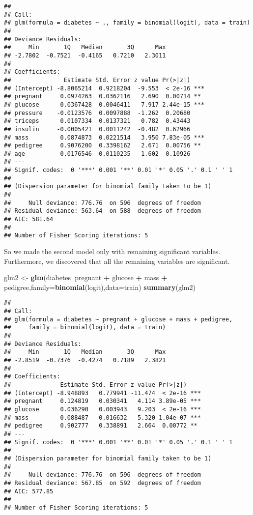 \documentclass[
]{article}
\newenvironment{Shaded}{\begin{snugshade}}{\end{snugshade}}
\newcommand{\DataTypeTok}[1]{\textcolor[rgb]{0.13,0.29,0.53}{#1}}
\newcommand{\KeywordTok}[1]{\textcolor[rgb]{0.13,0.29,0.53}{\textbf{#1}}}
\newcommand{\NormalTok}[1]{#1}
\newcommand{\OperatorTok}[1]{\textcolor[rgb]{0.81,0.36,0.00}{\textbf{#1}}}
\newcommand{\StringTok}[1]{\textcolor[rgb]{0.31,0.60,0.02}{#1}}
\begin{document}
\begin{verbatim}
## 
## Call:
## glm(formula = diabetes ~ ., family = binomial(logit), data = train)
## 
## Deviance Residuals: 
##     Min       1Q   Median       3Q      Max  
## -2.7802  -0.7521  -0.4165   0.7210   2.3011  
## 
## Coefficients:
##               Estimate Std. Error z value Pr(>|z|)    
## (Intercept) -8.8065214  0.9218204  -9.553  < 2e-16 ***
## pregnant     0.0974263  0.0362116   2.690  0.00714 ** 
## glucose      0.0367428  0.0046411   7.917 2.44e-15 ***
## pressure    -0.0123576  0.0097888  -1.262  0.20680    
## triceps      0.0107334  0.0137321   0.782  0.43443    
## insulin     -0.0005421  0.0011242  -0.482  0.62966    
## mass         0.0874873  0.0221514   3.950 7.83e-05 ***
## pedigree     0.9076200  0.3398162   2.671  0.00756 ** 
## age          0.0176546  0.0110235   1.602  0.10926    
## ---
## Signif. codes:  0 '***' 0.001 '**' 0.01 '*' 0.05 '.' 0.1 ' ' 1
## 
## (Dispersion parameter for binomial family taken to be 1)
## 
##     Null deviance: 776.76  on 596  degrees of freedom
## Residual deviance: 563.64  on 588  degrees of freedom
## AIC: 581.64
## 
## Number of Fisher Scoring iterations: 5
\end{verbatim}

So we made the second model only with remaining significant variables.
Furthermore, we discovered that all the remaining variables are
significant.

\begin{Shaded}
\begin{Highlighting}[]
\NormalTok{glm2 <-}\StringTok{ }\KeywordTok{glm}\NormalTok{(diabetes}\OperatorTok{~}\NormalTok{pregnant }\OperatorTok{+}\StringTok{ }\NormalTok{glucose }\OperatorTok{+}\StringTok{ }\NormalTok{mass }\OperatorTok{+}\StringTok{ }\NormalTok{pedigree,}\DataTypeTok{family=}\KeywordTok{binomial}\NormalTok{(logit),}\DataTypeTok{data=}\NormalTok{train)}
\KeywordTok{summary}\NormalTok{(glm2)}
\end{Highlighting}
\end{Shaded}

\begin{verbatim}
## 
## Call:
## glm(formula = diabetes ~ pregnant + glucose + mass + pedigree, 
##     family = binomial(logit), data = train)
## 
## Deviance Residuals: 
##     Min       1Q   Median       3Q      Max  
## -2.8519  -0.7376  -0.4274   0.7189   2.3821  
## 
## Coefficients:
##              Estimate Std. Error z value Pr(>|z|)    
## (Intercept) -8.948893   0.779941 -11.474  < 2e-16 ***
## pregnant     0.124819   0.030341   4.114 3.89e-05 ***
## glucose      0.036290   0.003943   9.203  < 2e-16 ***
## mass         0.088487   0.016632   5.320 1.04e-07 ***
## pedigree     0.902777   0.338891   2.664  0.00772 ** 
## ---
## Signif. codes:  0 '***' 0.001 '**' 0.01 '*' 0.05 '.' 0.1 ' ' 1
## 
## (Dispersion parameter for binomial family taken to be 1)
## 
##     Null deviance: 776.76  on 596  degrees of freedom
## Residual deviance: 567.85  on 592  degrees of freedom
## AIC: 577.85
## 
## Number of Fisher Scoring iterations: 5
\end{verbatim}
\end{document}
